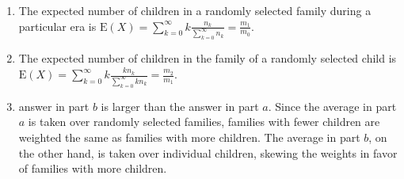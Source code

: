 \begin{enumerate}[label=(\alph*)]
\item The expected number of children in a randomly selected family during a
particular era is $\text{E}(X) = \sum_{k=0}^{\infty}k\frac{n_{k}}{\sum_{k=0}^
{\infty}n_{k}} = \frac{m_{1}}{m_{0}}$.

\item The expected number of children in the family of a randomly selected child
is $\text{E}(X) = \sum_{k=0}^{\infty}k\frac{kn_{k}}{\sum_{k=0}^{\infty}kn_{k}} =
\frac{m_{2}}{m_{1}}$.

\item answer in part $b$ is larger than the answer in part $a$. Since the
average in part $a$ is taken over randomly selected families, families with
fewer children are weighted the same as families with more children. The average
in part $b$, on the other hand, is taken over individual children, skewing the
weights in favor of families with more children.
\end{enumerate}